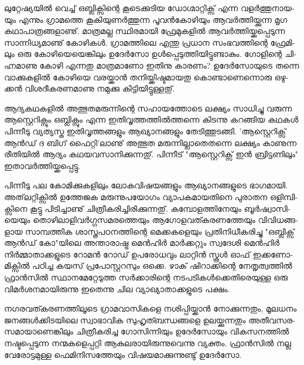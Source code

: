 
­ലു­റ്റേ­ഷ്യ­യില്‍ വെ­ച്ച് ഒബ്ലി­ക്സി­ന്റെ കൂ­ടെ­ക്കു­ടിയ ഡോ­ഗ്മാ­റ്റി­ക്സ് എന്ന വളര്‍­ത്തു­നാ­യ­യും എന്നും ഗ്രാ­മ­ത്തെ കൂ­കി­യു­ണര്‍­ത്തു­ന്ന 
പൂ­വന്‍­കോ­ഴി­യും ആവര്‍­ത്തി­യ്ക്കു­ന്ന മൃഗ കഥാ­പാ­ത്ര­ങ്ങ­ളാ­ണു്. മാ­ത്ര­മ­ല്ല സ്ഥി­ര­മാ­യി ഫ്രേ­മു­ക­ളില്‍ ആവര്‍­ത്തി­യ്ക്ക­പ്പെ­ടു­ന്ന 
സാ­ന്നി­ധ്യ­മാ­ണു് കോ­ഴി­കള്‍. ഗ്രാ­മ­ത്തി­ലെ എന്തു പ്ര­ധാന സം­ഭ­വ­ത്തി­ന്റെ ഫ്രേ­മി­ലും ഒരു കോ­ഴി­യെ­യെ­ങ്കി­ലും ഉദേര്‍­സോ 
ഉള്‍­പ്പെ­ടു­ത്തി­യി­ട്ടു­ണ്ടാ­കും. ഗോ­ളി­ന്റെ ചി­ഹ്ന­മാ­ണു കോ­ഴി എന്ന­തു മാ­ത്ര­മാ­ണോ ഇതി­നു കാ­ര­ണം? ഉദേര്‍­സോ­യു­ടെ തന്നെ 
വാ­ക്കു­ക­ളില്‍ കോ­ഴി­യെ വര­യ്ക്കാന്‍ തനി­യ്ക്കി­ഷ്ട­മാ­യ­തു കൊ­ണ്ടാ­ണെ­ന്നൊ­രു ഒഴു­ക്കന്‍ വി­ശ­ദീ­ക­ര­ണ­മാ­ണു നമു­ക്കു കി­ട്ടി­യി­ട്ടു­ള്ള­തു്.

ആ­ദ്യ­ക­ഥ­ക­ളില്‍ അത്ഭു­ത­മ­രു­ന്നി­ന്റെ സഹാ­യ­ത്തോ­ടെ ലക്ഷ്യം സാ­ധി­ച്ചു വരു­ന്ന ആസ്റ്റെ­റി­ക്സും ഒബ്ലി­ക്സും എന്ന 
ഇതി­വൃ­ത്ത­ത്തില്‍­ത്ത­ന്നെ കി­ട­ന്നു കറ­ങ്ങിയ കഥ­കള്‍ പി­ന്നീ­ടു വ്യ­ത്യ­സ്ത ഇതി­വൃ­ത്ത­ങ്ങ­ളും ആഖ്യാ­ന­ങ്ങ­ളും തേ­ടി­ത്തു­ട­ങ്ങി. 
'ആ­സ്റ്റെ­റി­ക്സ് ആന്‍­ഡ് ദ ബി­ഗ് ഫൈ­റ്റി­'­ലാ­ണു് അത്ഭുത മരു­ന്നി­ല്ലാ­തെ­ത­ന്നെ ലക്ഷ്യം കാ­ണു­ന്ന രീ­തി­യില്‍ ആദ്യം 
കഥ­യ­വ­സാ­നി­ക്കു­ന്ന­തു്. പി­ന്നീ­ട് "ആ­സ്റ്റെ­റി­ക്സ് ഇന്‍ ബ്രി­ട്ട­ണി­ലും" ഇതാ­വര്‍­ത്തി­യ്ക്ക­പ്പെ­ട്ടു­.

­പി­ന്നീ­ടു പല കോ­മി­ക്കു­ക­ളി­ലും ലോ­ക­വി­ഷ­യ­ങ്ങ­ളും ആഖ്യാ­ന­ങ്ങ­ളു­ടെ ഭാ­ഗ­മാ­യി. അത്‌­ല­റ്റി­ക്സില്‍ ഉത്തേ­ജക 
മരു­ന്നു­പ­യോ­ഗം വ്യാ­പ­ക­മാ­യ­തി­നെ പു­രാ­തന ഒളി­മ്പി­ക്സി­നെ കൂ­ട്ടു പി­ടി­ച്ചാ­ണു് ചി­ത്രീ­ക­രി­ച്ചി­രി­ക്കു­ന്ന­തു്. കമ്പോ­ള­ത്തി­നേ­യും 
ബൂര്‍­ഷ്വാ­സി­യെ­യും തൊ­ഴി­ലാ­ളി­വര്‍­ഗ്ഗ­സ­മ­ര­ത്തെ­യും ആഗോ­ള­വ­ത്ക­ര­ണ­ത്തേ­യും വി­വി­ധ­ങ്ങ­ളായ സാ­മ്പ­ത്തിക 
ശാ­സ്ത്ര­പ­ഠ­ന­ത്തി­ന്റെ മെ­ക്ക­ക­ളെ­യും പ്ര­തി­നി­ധീ­ക­രി­ച്ചു "ഒ­ബ്ലി­ക്സ് ആന്‍­ഡ് കോ­"­യി­ലെ അന്താ­രാ­ഷ്ട്ര മെന്‍­ഹിര്‍ മാര്‍­ക്ക­റ്റും 
സ്വ­ദേ­ശി മെന്‍­ഹിര്‍ നിര്‍­മ്മാ­താ­ക്ക­ളു­ടെ റോ­മന്‍ റോ­ഡ് ഉപ­രോ­ധ­വും ലാ­റ്റിന്‍ സ്കൂള്‍ ഓഫ് ഇക്ക­ണോ­മി­ക്സില്‍ പഠി­ച്ച കയ­സ് 
പ്ര­പോ­സ്റ്റ­റ­സും ഒക്കെ. ഴാ­ക് ഷി­റാ­ക്കി­ന്റെ നേ­തൃ­ത്വ­ത്തില്‍ ഫ്രാന്‍­സില്‍ സ്ഥാ­ന­മേ­റ്റേ­ടു­ത്ത സര്‍­ക്കാ­രി­ന്റെ 
നട­പ­ടി­കള്‍­ക്കെ­തി­രെ­യു­ള്ള ഒരു വി­മര്‍­ശ­ന­മാ­യി­രു­ന്നു ഇതെ­ന്നു ചില വ്യാ­ഖ്യാ­താ­ക്ക­ളു­ടെ പക്ഷം­.

­ന­ഗ­ര­വ­ത്ക­ര­ണ­ത്തി­ലൂ­ടെ ഗ്രാ­മ­വാ­സി­ക­ളെ നശി­പ്പി­യ്ക്കാന്‍ നോ­ക്കു­ന്ന­തും, മൂ­ല­ധ­നം ജന­ങ്ങള്‍­ക്കി­ട­യി­ലെ സ്വാ­ഭാ­വിക 
സു­ഹൃ­ത്ബ­ന്ധ­ങ്ങ­ളെ ഉല­യ്ക്കു­ന്ന­തും അതീ­വ­സ­ര­സ­മാ­യാ­ണെ­ങ്കി­ലും ചി­ത്രീ­ക­രി­ച്ച ഗോ­സി­ന്നി­യും ഉദേര്‍­സോ­യും 
വി­ക­സ­ന­ത്തില്‍ നഷ്ട­പ്പെ­ടു­ന്ന നന്മ­ക­ളെ­പ്പ­റ്റി ആകു­ല­രാ­യി­രു­ന്നു­വെ­ന്നു വ്യ­ക്തം. ഫ്രാന്‍­സില്‍ നല്ല വേ­രോ­ട്ട­മു­ള്ള 
ഫെ­മി­നി­സ­ത്തേ­യും വി­ഷ­യ­മാ­ക്കു­ന്നു­ണ്ടു് ഉദേര്‍­സോ­.

